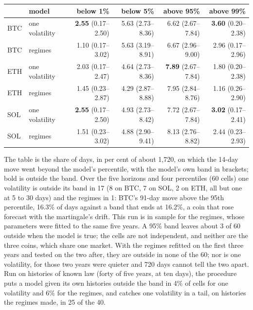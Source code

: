 \documentclass[11pt,a4paper]{article}
\begin{document}
\begin{longtable}{l l r r r r}
\toprule
 & model & below 1\% & below 5\% & above 95\% & above 99\% \\
\midrule
BTC & one volatility & \textbf{2.55} (0.17--2.50) & 5.63 (2.73--8.36) & 6.62 (2.67--7.84) & \textbf{3.60} (0.20--2.38) \\
BTC & regimes & 1.10 (0.17--3.02) & 5.63 (3.19--8.91) & 6.67 (2.96--9.00) & 2.96 (0.17--2.96) \\
ETH & one volatility & 2.03 (0.17--2.47) & 4.64 (2.73--8.36) & \textbf{7.89} (2.67--7.84) & 1.80 (0.20--2.38) \\
ETH & regimes & 1.45 (0.23--2.87) & 4.29 (2.87--8.88) & 7.95 (2.84--8.76) & 1.16 (0.26--2.90) \\
SOL & one volatility & \textbf{2.55} (0.17--2.50) & 4.93 (2.73--8.42) & 7.72 (2.67--7.84) & \textbf{3.02} (0.17--2.41) \\
SOL & regimes & 1.51 (0.23--3.02) & 4.88 (2.90--9.41) & 8.13 (2.76--8.82) & 2.44 (0.23--2.93) \\
\bottomrule
\end{longtable}

The table is the share of days, in per cent of about 1,720, on which the 14-day move went beyond the model's percentile, with the model's own band in brackets; bold is outside the band. Over the five horizons and four percentiles (60 cells) one volatility is outside its band in 17 (8 on BTC, 7 on SOL, 2 on ETH, all but one at 5 to 30 days) and the regimes in 1: BTC's 91-day move above the 95th percentile, 16.3\% of days against a band that ends at 16.2\%, a coin that rose forecast with the martingale's drift. This run is in sample for the regimes, whose parameters were fitted to the same five years. A 95\% band leaves about 3 of 60 outside when the model is true; the cells are not independent, and neither are the three coins, which share one market. With the regimes refitted on the first three years and tested on the two after, they are outside in none of the 60; nor is one volatility, for those two years were quieter and 720 days cannot tell the two apart. Run on histories of known law (forty of five years, at ten days), the procedure puts a model given its own histories outside the band in 4\% of cells for one volatility and 6\% for the regimes, and catches one volatility in a tail, on histories the regimes made, in 25 of the 40.
\end{document}
